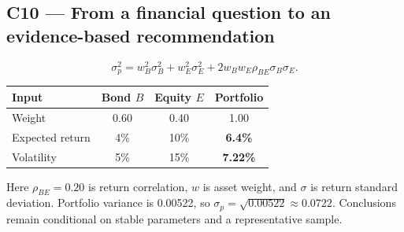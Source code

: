 \subsection*{C10 --- From a financial question to an evidence-based recommendation}

\begin{center}
\end{center}

\[
  \sigma_p^2=w_B^2\sigma_B^2+w_E^2\sigma_E^2
    +2w_Bw_E\rho_{BE}\sigma_B\sigma_E.
\]

\begin{center}
  \begin{tabular}{@{}lccc@{}}
    \toprule
    \textbf{Input} & \textbf{Bond \(B\)} & \textbf{Equity \(E\)} & \textbf{Portfolio}\\
    \midrule
    Weight & 0.60 & 0.40 & 1.00\\
    Expected return & 4\% & 10\% & \textbf{6.4\%}\\
    Volatility & 5\% & 15\% & \textbf{7.22\%}\\
    \bottomrule
  \end{tabular}
\end{center}

Here \(\rho_{BE}=0.20\) is return correlation, \(w\) is asset weight, and \(\sigma\) is return standard deviation. Portfolio variance is 0.00522, so \(\sigma_p=\sqrt{0.00522}\approx0.0722\). Conclusions remain conditional on stable parameters and a representative sample.


